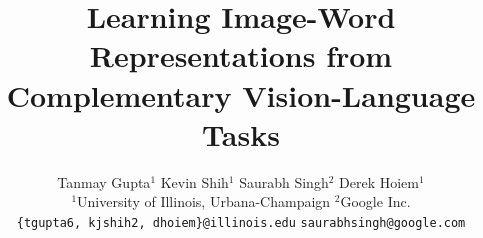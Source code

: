 \documentclass[10pt,twocolumn,letterpaper]{article}
\begin{document}
\title{Learning Image-Word Representations from Complementary Vision-Language Tasks}
\author{Tanmay Gupta$^1$ \hspace{0,5cm} Kevin Shih$^1$ \hspace{0,5cm} Saurabh Singh$^2$ \hspace{0,5cm} Derek Hoiem$^1$\\
$^1$University of Illinois, Urbana-Champaign  \hspace{0,5cm} $^2$Google Inc.\\
{\tt\small \{tgupta6, kjshih2, dhoiem\}@illinois.edu} \hspace{0,5cm} {\tt\small saurabhsingh@google.com}
}

\maketitle
\end{document}
